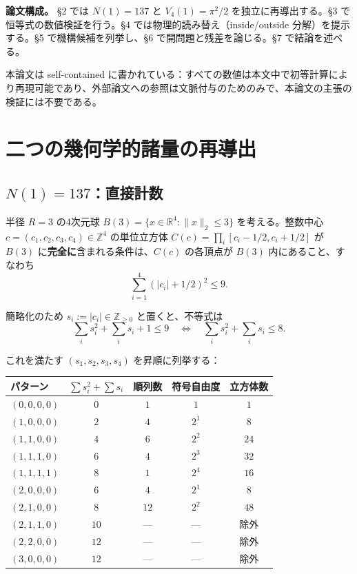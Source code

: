 \documentclass[a4paper,11pt]{ltjsarticle}
\begin{document}
\textbf{論文構成。} §2 では $N(1) = 137$ と $V_4(1) = \pi^2/2$ を独立に再導出する。§3 で恒等式の数値検証を行う。§4 では物理的読み替え（inside/outside 分解）を提示する。§5 で機構候補を列挙し、§6 で開問題と残差を論じる。§7 で結論を述べる。

本論文は self-contained に書かれている：すべての数値は本文中で初等計算により再現可能であり、外部論文への参照は文脈付与のためのみで、本論文の主張の検証には不要である。

\section{二つの幾何学的諸量の再導出}

\subsection{$N(1) = 137$：直接計数}

半径 $R = 3$ の4次元球 $B(3) = \{x \in \mathbb{R}^4 : \|x\|_2 \le 3\}$ を考える。整数中心 $c = (c_1, c_2, c_3, c_4) \in \mathbb{Z}^4$ の単位立方体 $C(c) = \prod_i [c_i - 1/2, c_i + 1/2]$ が $B(3)$ に\textbf{完全に}含まれる条件は、$C(c)$ の各頂点が $B(3)$ 内にあること、すなわち
\[ \sum_{i=1}^{4} (|c_i| + 1/2)^2 \le 9. \]

簡略化のため $s_i := |c_i| \in \mathbb{Z}_{\ge 0}$ と置くと、不等式は
\[ \sum_i s_i^2 + \sum_i s_i + 1 \le 9 \quad\iff\quad \sum_i s_i^2 + \sum_i s_i \le 8. \]

これを満たす $(s_1, s_2, s_3, s_4)$ を昇順に列挙する：

\begin{center}
\begin{tabular}{lcccc}
\toprule
パターン & $\sum s_i^2 + \sum s_i$ & 順列数 & 符号自由度 & 立方体数 \\
\midrule
$(0,0,0,0)$ & $0$ & $1$ & $1$ & $1$ \\
$(1,0,0,0)$ & $2$ & $4$ & $2^1$ & $8$ \\
$(1,1,0,0)$ & $4$ & $6$ & $2^2$ & $24$ \\
$(1,1,1,0)$ & $6$ & $4$ & $2^3$ & $32$ \\
$(1,1,1,1)$ & $8$ & $1$ & $2^4$ & $16$ \\
$(2,0,0,0)$ & $6$ & $4$ & $2^1$ & $8$ \\
$(2,1,0,0)$ & $8$ & $12$ & $2^2$ & $48$ \\
$(2,1,1,0)$ & $10$ & --- & --- & 除外 \\
$(2,2,0,0)$ & $12$ & --- & --- & 除外 \\
$(3,0,0,0)$ & $12$ & --- & --- & 除外 \\
\bottomrule
\end{tabular}
\end{center}
\end{document}
